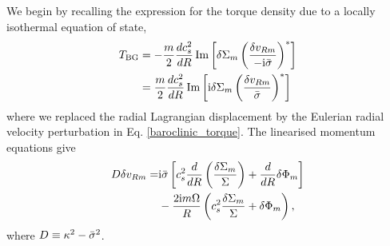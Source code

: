 We begin by recalling the expression for the torque density due to a
locally isothermal equation of state,
\begin{align}
  T_\mathrm{BG} &= -\frac{m}{2}\frac{dc_s^2}{dR}\operatorname{Im}\left[\delta\Sigma_m \left(\frac{\delta
        v_{Rm}}{-\mathrm{i}\bar{\sigma}}\right)^*\right] \notag\\
  & = \frac{m}{2}\frac{dc_s^2}{dR}\operatorname{Im}\left[\mathrm{i} \delta\Sigma_m \left(\frac{\delta
        v_{Rm}}{\bar{\sigma}}\right)^*\right]
\end{align}
where we replaced the radial Lagrangian displacement by the Eulerian
radial velocity perturbation in Eq. \ref{baroclinic_torque}. 
The linearised momentum equations give
\begin{align}
  D\delta v_{Rm} =& 
  \mathrm{i}\bar{\sigma}\left[c_s^2\frac{d}{dR}\left(\frac{\delta\Sigma_m}{\Sigma}\right)
    + \frac{d}{dR}\delta\Phi_m\right] \notag\\ 
  &- \frac{2\mathrm{i}
    m\Omega}{R}\left(c_s^2\frac{\delta\Sigma_m}{\Sigma} +
    \delta\Phi_m\right),
\end{align}
where $D\equiv \kappa^2 - \bar{\sigma}^2$. 


